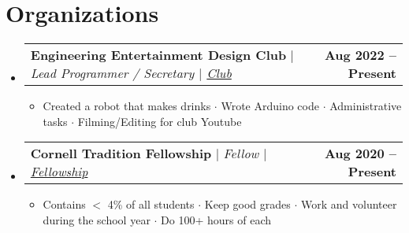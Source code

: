 \documentclass[letterpaper,11pt]{article}
\makeatletter
\newcommand{\resumeItem}[1]{
  \item\small{
    {#1 \vspace{-2pt}}
  }
}
\newcommand{\resumeProjectHeading}[2]{
    \item
    \begin{tabular*}{1.001\textwidth}{l@{\extracolsep{\fill}}r}
      \small#1 & \textbf{\small #2}\\
    \end{tabular*}\vspace{-7pt}
}
\newcommand{\resumeSubHeadingListStart}{\begin{itemize}[leftmargin=0.0in, label={}]}
\newcommand{\resumeSubHeadingListEnd}{\end{itemize}}
\newcommand{\resumeItemListStart}{\begin{itemize}}
\newcommand{\resumeItemListEnd}{\end{itemize}\vspace{-5pt}}
\makeatother
\begin{document}
\section{Organizations}
    \vspace{-6pt}
    \resumeSubHeadingListStart
    \resumeProjectHeading
          {\textbf{Engineering Entertainment Design Club} $|$ \emph{Lead Programmer / Secretary  $|$
          \href{https://www.linkedin.com/company/cornell-entertainment-engineering-and-design-club/}{Club}}}{Aug 2022 -- Present}
          \resumeItemListStart
            \resumeItem{ Created a robot that makes drinks $\cdot$ Wrote Arduino 
            code $\cdot$ Administrative tasks $\cdot$ Filming/Editing for club Youtube}
          \resumeItemListEnd
          \vspace{-14pt}
    \resumeProjectHeading
          {\textbf{Cornell Tradition Fellowship} $|$ \emph{Fellow $|$
          \href{https://scl.cornell.edu/get-involved/cornell-commitment/cornell-tradition}{Fellowship}
          }}{Aug 2020 -- Present}
          \resumeItemListStart
            \resumeItem{Contains $<$ 4\% of all students $\cdot$ Keep good grades
             $\cdot$ Work and volunteer during the school year $\cdot$ Do 100+ hours of each}
          \resumeItemListEnd
          \vspace{-14pt}
    \resumeSubHeadingListEnd
\vspace{-3pt}
\end{document}

